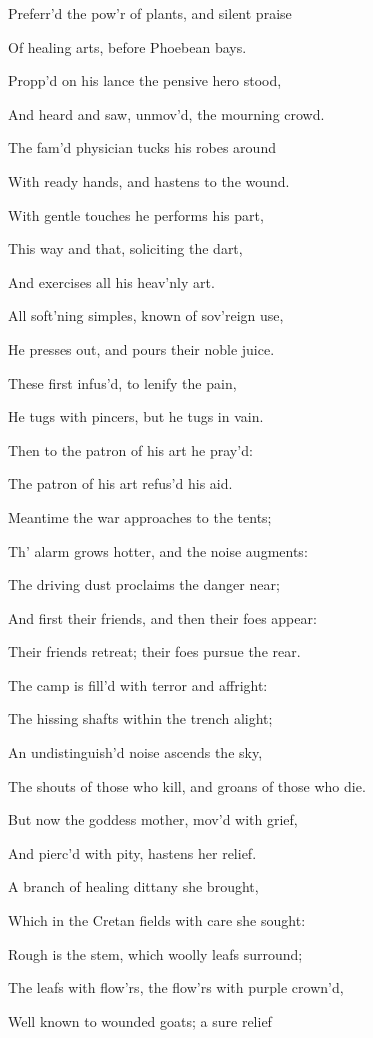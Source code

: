 Preferr’d the pow’r of plants, and silent praise

Of healing arts, before Phoebean bays.

Propp’d on his lance the pensive hero stood,

And heard and saw, unmov’d, the mourning crowd.

The fam’d physician tucks his robes around

With ready hands, and hastens to the wound.

With gentle touches he performs his part,

This way and that, soliciting the dart,

And exercises all his heav’nly art.

All soft’ning simples, known of sov’reign use,

He presses out, and pours their noble juice.

These first infus’d, to lenify the pain,

He tugs with pincers, but he tugs in vain.

Then to the patron of his art he pray’d:

The patron of his art refus’d his aid.

Meantime the war approaches to the tents;

Th’ alarm grows hotter, and the noise augments:

The driving dust proclaims the danger near;

And first their friends, and then their foes appear:

Their friends retreat; their foes pursue the rear.

The camp is fill’d with terror and affright:

The hissing shafts within the trench alight;

An undistinguish’d noise ascends the sky,

The shouts of those who kill, and groans of those who die.

But now the goddess mother, mov’d with grief,

And pierc’d with pity, hastens her relief.

A branch of healing dittany she brought,

Which in the Cretan fields with care she sought:

Rough is the stem, which woolly leafs surround;

The leafs with flow’rs, the flow’rs with purple crown’d,

Well known to wounded goats; a sure relief

